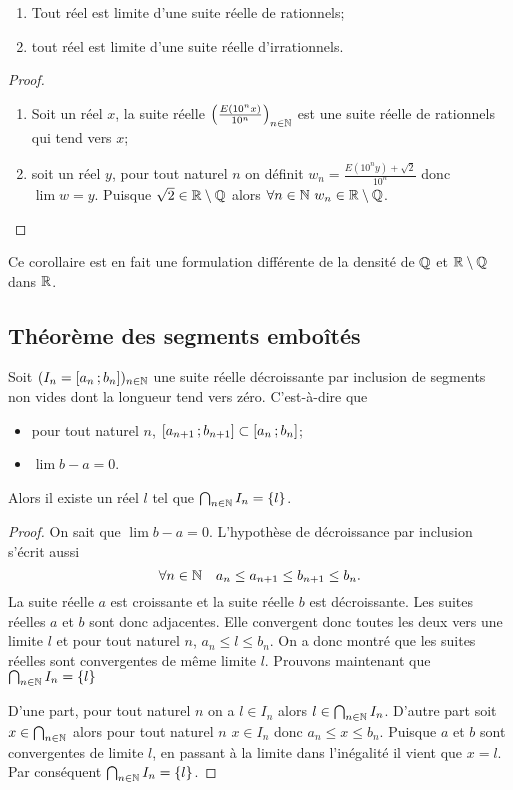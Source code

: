 \begin{cor}
  \begin{enumerate}
  \item Tout réel est limite d'une suite réelle de rationnels;
  \item tout réel est limite d'une suite réelle d'irrationnels.
  \end{enumerate}
\end{cor}
\begin{proof}
  \begin{enumerate}
  \item Soit un réel $x$, la suite réelle $\left(\frac{E(10^n x)}{10^n}\right)_{n \in \mathbb{N}}$ est une suite réelle de rationnels qui tend vers $x$;
  \item soit un réel $y$, pour tout naturel $n$ on définit $w_n=\frac{E(10^n y)+\sqrt{2}}{10^n}$ donc $\lim w =y$. Puisque $\sqrt{2} \in \mathbb{R} \setminus \mathbb{Q}$ alors $\forall n \in \mathbb{N} \ w_n \in \mathbb{R} \setminus \mathbb{Q}$.
  \end{enumerate}
\end{proof}
 Ce corollaire est en fait une formulation différente de la densité de $\mathbb{Q}$ et $\mathbb{R} \setminus \mathbb{Q}$ dans $\mathbb{R}$.

\subsection{Théorème des segments emboîtés}

\begin{theo}
  Soit $(I_n=\left[ a_n \, ;  b_n \right])_{n \in \mathbb{N}}$ une suite réelle décroissante par inclusion de segments non vides dont la longueur tend vers zéro. C'est-à-dire que
  \begin{itemize}
  \item pour tout naturel $n$, $\left[ a_{n+1} \, ;  b_{n+1} \right] \subset \left[ a_{n} \, ;  b_{n} \right]$;
  \item $\lim b-a =0$.
  \end{itemize}
Alors il existe un réel $l$ tel que $\bigcap_{n \in \mathbb{N}} I_n = \{l\}$.
\end{theo}
\begin{proof}
  On sait que $\lim b-a = 0$. L'hypothèse de décroissance par inclusion s'écrit aussi
  \begin{equation}
    \forall n \in \mathbb{N} \quad a_n \leq a_{n+1} \leq b_{n+1} \leq b_n.
  \end{equation}
La suite réelle $a$ est croissante et la suite réelle $b$ est décroissante. Les suites réelles $a$ et $b$ sont donc adjacentes. Elle convergent donc toutes les deux vers une limite $l$ et pour tout naturel $n$, $a_n \leq l \leq b_n$. On a donc montré que les suites réelles sont convergentes de même limite $l$. Prouvons maintenant que $\bigcap_{n \in \mathbb{N}} I_n = \{l\}$

D'une part, pour tout naturel $n$ on a $l \in I_n$ alors $l \in \bigcap_{n \in \mathbb{N}} I_n$. D'autre part soit $x \in \bigcap_{n \in \mathbb{N}}$ alors pour tout naturel $n$ $x \in I_n$ donc $a_n \leq x \leq b_n$. Puisque $a$ et $b$ sont convergentes de limite $l$, en passant à la limite dans l'inégalité il vient que $x=l$. Par conséquent $\bigcap_{n \in \mathbb{N}} I_n = \{l\}$.
\end{proof}

